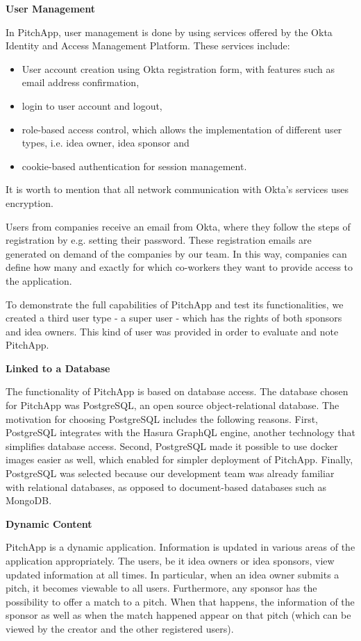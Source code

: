 \textbf{User Management}

In PitchApp, user management is done by using services offered by the Okta Identity and Access Management Platform. These services include:

\begin{itemize}
	\item User account creation using Okta registration form, with features such as email address confirmation,
	\item login to user account and logout,
	\item role-based access control, which allows the implementation of different user types, i.e. idea owner, idea sponsor and
	\item cookie-based authentication for session management.
\end{itemize}

It is worth to mention that all network communication with Okta’s services uses encryption.

Users from companies receive an email from Okta, where they follow the steps of registration by e.g. setting their password. These registration emails are generated on demand of the companies by our team. In this way, companies can define how many and exactly for which co-workers they want to provide access to the application.

To demonstrate the full capabilities of PitchApp and test its functionalities, we created a third user type - a super user - which has the rights of both sponsors and idea owners. This kind of user was provided in order to evaluate and note PitchApp.

\textbf{Linked to a Database}

The functionality of PitchApp is based on database access. The database chosen for PitchApp was PostgreSQL, an open source object-relational database. The motivation for choosing PostgreSQL includes the following reasons.
First, PostgreSQL integrates with the Hasura GraphQL engine, another technology that simplifies database access. Second, PostgreSQL made it possible to use docker images easier as well, which enabled for simpler deployment of PitchApp. Finally, PostgreSQL was selected because our development team was already familiar with relational databases, as opposed to document-based databases such as MongoDB.

\textbf{Dynamic Content}

PitchApp is a dynamic application. Information is updated in various areas of the application appropriately. The users, be it idea owners or idea sponsors, view updated information at all times.
In particular, when an idea owner submits a pitch, it becomes viewable to all users. Furthermore, any sponsor has the possibility to offer a match to a pitch. When that happens, the information of the sponsor as well as when the match happened appear on that pitch (which can be viewed by the creator and the other registered users).

